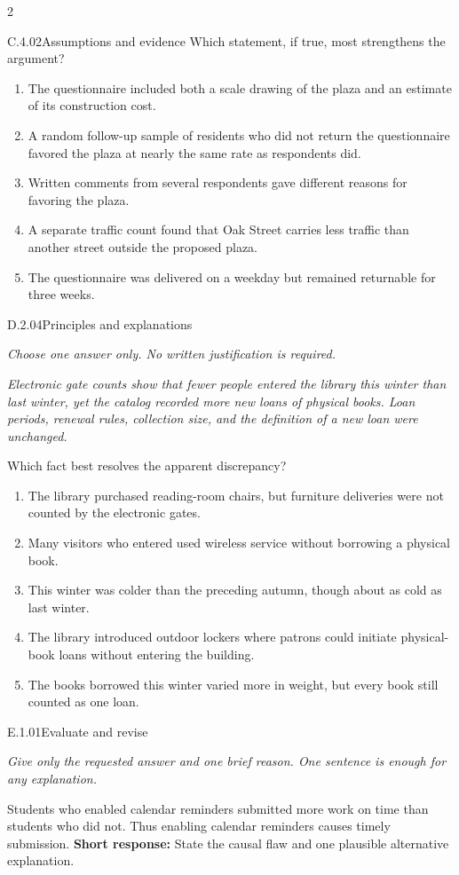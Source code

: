 \documentclass[9pt]{extarticle}
\newcommand{\choice}[1]{\item #1}
\begin{document}
\begin{multicols}{2}
\begin{DenseCoreProblem}{C.4.02}{Assumptions and evidence}
Which statement, if true, most strengthens the argument?
\begin{enumerate}[label=(\alph*)]
  \choice{The questionnaire included both a scale drawing of the plaza and an estimate of its construction cost.}
  \choice{A random follow-up sample of residents who did not return the questionnaire favored the plaza at nearly the same rate as respondents did.}
  \choice{Written comments from several respondents gave different reasons for favoring the plaza.}
  \choice{A separate traffic count found that Oak Street carries less traffic than another street outside the proposed plaza.}
  \choice{The questionnaire was delivered on a weekday but remained returnable for three weeks.}
\end{enumerate}
\end{DenseCoreProblem}
\begin{DenseCoreProblem}{D.2.04}{Principles and explanations}
{\scriptsize\textit{Choose one answer only. No written justification is required.}\par}
\emph{Electronic gate counts show that fewer people entered the library this winter than last winter, yet the catalog recorded more new loans of physical books. Loan periods, renewal rules, collection size, and the definition of a new loan were unchanged.}

Which fact best resolves the apparent discrepancy?
\begin{enumerate}[label=(\alph*)]
  \choice{The library purchased reading-room chairs, but furniture deliveries were not counted by the electronic gates.}
  \choice{Many visitors who entered used wireless service without borrowing a physical book.}
  \choice{This winter was colder than the preceding autumn, though about as cold as last winter.}
  \choice{The library introduced outdoor lockers where patrons could initiate physical-book loans without entering the building.}
  \choice{The books borrowed this winter varied more in weight, but every book still counted as one loan.}
\end{enumerate}
\end{DenseCoreProblem}
\begin{DenseCoreProblem}{E.1.01}{Evaluate and revise}
{\scriptsize\textit{Give only the requested answer and one brief reason. One sentence is enough for any explanation.}\par}
Students who enabled calendar reminders submitted more work on time than students who did not. Thus enabling calendar reminders causes timely submission.
\textbf{Short response:} State the causal flaw and one plausible alternative explanation.
\end{DenseCoreProblem}
\end{multicols}
\end{document}

